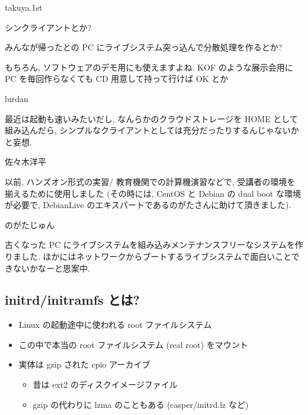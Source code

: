 \documentclass[mingoth,a4paper]{jsarticle}
\begin{document}
\begin{prework}{ takuya.1st }

シンクライアントとか?

みんなが帰ったとの PC にライブシステム突っ込んで分散処理を作るとか?

もちろん, ソフトウェアのデモ用にも使えますよね.
KOF のような展示会用に PC を毎回作らなくても CD 用意して持って行けば OK とか


\end{prework}



\begin{prework}{ lurdan }

最近は起動も速いみたいだし, なんらかのクラウドストレージを HOME として組み込んだら, シンプルなクライアントとしては充分だったりするんじゃないかと妄想.

\end{prework}



\begin{prework}{ 佐々木洋平 }

以前, ハンズオン形式の実習/ 教育機関での計算機演習などで, 受講者の環境を揃えるために使用しました (その時には, CentOS と Debian の dual boot な環境が必要で, DebianLive のエキスパートであるのがたさんに助けて頂きました).

\end{prework}



\begin{prework}{ のがたじゅん }

古くなった PC にライブシステムを組み込みメンテナンスフリーなシステムを作りました. ほかにはネットワークからブートするライブシステムで面白いことできないかなーと思案中.

\end{prework}




\subsection{initrd/initramfs とは?}

\begin{itemize}
\item Linux の起動途中に使われる root ファイルシステム
\item この中で本当の root ファイルシステム (real root) をマウント
\item 実体は gzip された cpio アーカイブ

\begin{itemize}
\item 昔は ext2 のディスクイメージファイル
\item gzip の代わりに lzma のこともある (casper/initrd.lz など)
\end{itemize}

\end{itemize}
\end{document}
